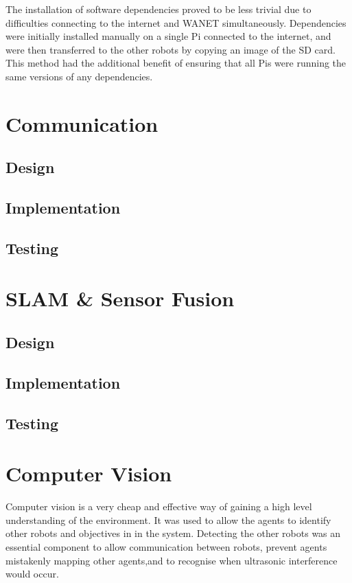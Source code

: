 The installation of software dependencies proved to be less trivial due to 
difficulties connecting to the internet and WANET simultaneously. 
Dependencies were initially installed manually on a single Pi connected to 
the internet, and were then transferred to the other robots by copying an 
image of the SD card. This method had the additional benefit of ensuring 
that all Pis were running the same versions of any dependencies.

\section{Communication}\label{soft/comms}

\subsection{Design}\label{soft/comms/design}

\subsection{Implementation}\label{soft/comms/impl}

\subsection{Testing}\label{soft/comms/test}




\section{SLAM \& Sensor Fusion}\label{soft/SLAM}

\subsection{Design}\label{soft/SLAM/design}

\subsection{Implementation}\label{soft/SLAM/impl}

\subsection{Testing}\label{soft/SLAM/test}



\section{Computer Vision}\label{soft/cv}
Computer vision is a very cheap and effective way of gaining a high level understanding of the environment. It was used to allow the agents to identify other robots and objectives in in the system. Detecting the other robots was an essential component to allow communication between robots, prevent agents mistakenly mapping other agents,and to recognise when ultrasonic interference would occur. 

